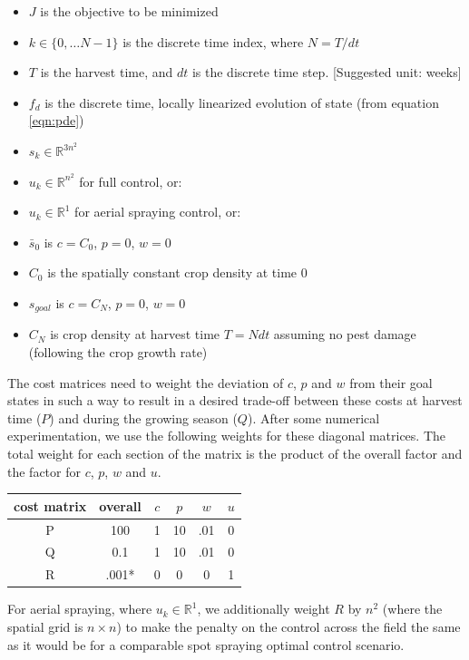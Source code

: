 \documentclass[11pt]{article}
\begin{document}
\begin{itemize}
\setlength\itemsep{-1pt}
\item $J$ is the objective to be minimized
\item $k \in \{0, \dots N-1\}$ is the discrete time index, where $N = T/dt$
\item $T$ is the harvest time, and $dt$ is the discrete time step. [Suggested unit: weeks]
\item $f_d$ is the discrete time, locally linearized evolution of state (from equation \ref{eqn:pde})
\item $s_k \in \mathbb{R}^{3n^2}$
\item $u_k \in \mathbb{R}^{n^2}$ for full control, or:
\item $u_k \in \mathbb{R}^{1}$ for aerial spraying control, or:
\item $\bar{s}_0$ is $c = C_0$, $p = 0$, $w = 0$
\item $C_0$ is the spatially constant crop density at time $0$
\item $s_{goal}$ is $c = C_N$, $p = 0$, $w = 0$
\item $C_N$ is crop density at harvest time $T = N dt$ assuming no pest damage (following the crop growth rate)
\end{itemize}

The cost matrices need to weight the deviation of $c$, $p$ and $w$ from their goal states in such a way to result in a desired trade-off between these costs at harvest time ($P$) and during the growing season ($Q$). After some numerical experimentation, we use the following weights for these diagonal matrices. The total weight for each section of the matrix is the product of the overall factor and the factor for $c$, $p$, $w$ and $u$.

\begin{center}
	\begin{tabular}{ | c | c | c | c | c | c | }
	\hline
    cost matrix & overall & $c$ & $p$ & $w$ & $u$ \\
    \hline
    P & 100 & 1 & 10 & .01 & 0 \\
    \hline
    Q & 0.1 & 1 & 10 & .01 & 0 \\
    \hline
    R & .001* & 0 & 0 & 0 & 1 \\
    \hline
    \end{tabular}
\end{center}

For aerial spraying, where $u_k \in \mathbb{R}^{1}$, we additionally weight $R$ by $n^2$ (where the spatial grid is $n \times n$) to make the penalty on the control across the field the same as it would be for a comparable spot spraying optimal control scenario.
\end{document}
